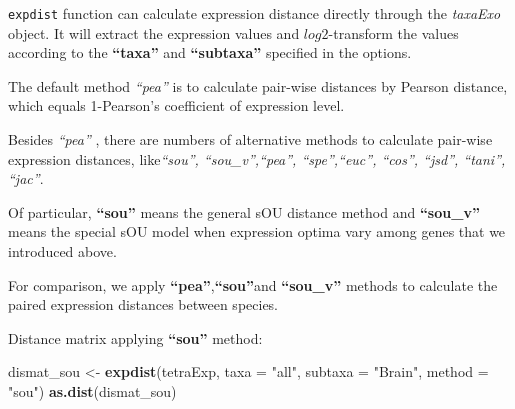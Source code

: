 \documentclass[]{book}
\newenvironment{Shaded}{\begin{snugshade}}{\end{snugshade}}
\newcommand{\DataTypeTok}[1]{\textcolor[rgb]{0.13,0.29,0.53}{#1}}
\newcommand{\KeywordTok}[1]{\textcolor[rgb]{0.13,0.29,0.53}{\textbf{#1}}}
\newcommand{\NormalTok}[1]{#1}
\newcommand{\StringTok}[1]{\textcolor[rgb]{0.31,0.60,0.02}{#1}}
\begin{document}
\texttt{expdist} function can calculate expression distance directly through the \emph{taxaExo} object. It will extract the expression values and \(log2\)-transform the values according to the \textbf{``taxa''} and \textbf{``subtaxa''} specified in the options.

The default method \emph{``pea''} is to calculate pair-wise distances by Pearson distance, which equals 1-Pearson's coefficient of expression level.

Besides \emph{``pea''} , there are numbers of alternative methods to calculate pair-wise expression distances, like\emph{``sou'', ``sou\_v'',``pea'', ``spe'',``euc'', ``cos'', ``jsd'', ``tani'', ``jac''}.

Of particular, \textbf{``sou''} means the general sOU distance method and \textbf{``sou\_v''} means the special sOU model when expression optima vary among genes that we introduced above.

For comparison, we apply \textbf{``pea''},\textbf{``sou''}and \textbf{``sou\_v''} methods to calculate the paired expression distances between species.

Distance matrix applying \textbf{``sou''} method:

\begin{Shaded}
\begin{Highlighting}[]
\NormalTok{dismat_sou <-}\StringTok{ }\KeywordTok{expdist}\NormalTok{(tetraExp, }\DataTypeTok{taxa =} \StringTok{"all"}\NormalTok{,}
                 \DataTypeTok{subtaxa =} \StringTok{"Brain"}\NormalTok{,}
                 \DataTypeTok{method =} \StringTok{"sou"}\NormalTok{)}
\KeywordTok{as.dist}\NormalTok{(dismat_sou)}
\end{Highlighting}
\end{Shaded}
\end{document}
